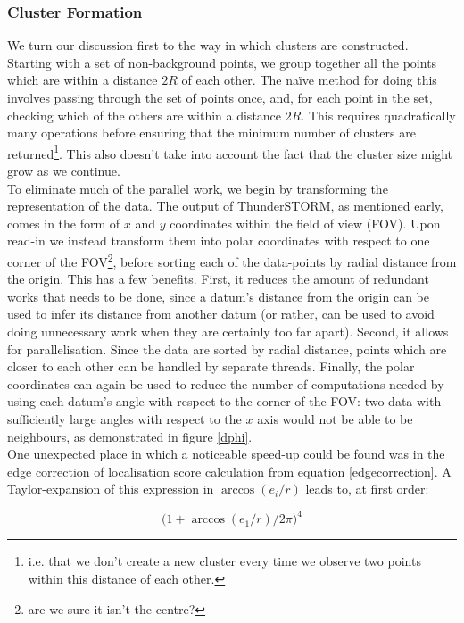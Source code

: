 \documentclass[11pt]{article}
\begin{document}
\subsubsection{Cluster Formation} \label{Clusterisation}
We turn our discussion first to the way in which clusters are constructed. Starting with a set of non-background points, we group together all the points which are within a distance $2R$ of each other. The na{\"i}ve method for doing this involves passing through the set of points once, and, for each point in the set, checking which of the others are within a distance $2R$. This requires quadratically many operations before ensuring that the minimum number of clusters are returned\footnote{i.e. that we don't create a new cluster every time we observe two points within this distance of each other.}. This also doesn't take into account the fact that the cluster size might grow as we continue.\\

To eliminate much of the parallel work, we begin by transforming the representation of the data. The output of ThunderSTORM, as mentioned early, comes in the form of $x$ and $y$ coordinates within the field of view (FOV). Upon read-in we instead transform them into polar coordinates with respect to one corner of the FOV\footnote{are we sure it isn't the centre?}, before sorting each of the data-points by radial distance from the origin. This has a few benefits. First, it reduces the amount of redundant works that needs to be done, since a datum's distance from the origin can be used to infer its distance from another datum (or rather, can be used to avoid doing unnecessary work when they are certainly too far apart). Second, it allows for parallelisation. Since the data are sorted by radial distance, points which are closer to each other can be handled by separate threads. Finally, the polar coordinates can again be used to reduce the number of computations needed by using each datum's angle with respect to the corner of the FOV: two data with sufficiently large angles with respect to the $x$ axis would not be able to be neighbours, as demonstrated in figure \ref{dphi}.\\

One unexpected place in which a noticeable speed-up could be found was in the edge correction of 
localisation score calculation from equation \ref{edgecorrection}. A Taylor-expansion of this expression in $\arccos(e_i/r)$ leads to, at first order:

\begin{equation*}
	\bigg(1 + \arccos(e_1/r)/2\pi\bigg)^4
\end{equation*}
\end{document}
